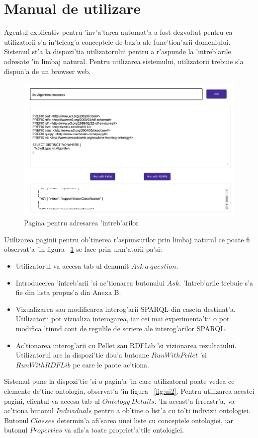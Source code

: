 \documentclass[12pt,a4paper,twoside]{report}
\begin{document}
\section{Manual de utilizare}

Agentul explicativ pentru 'inv'a'tarea automat'a a fost dezvoltat pentru ca utilizatorii s'a in'teleag'a conceptele de baz'a ale func'tion'arii domeniului. Sistemul st'a la dispozi'tia utilizatorului pentru a r'aspunde la 'intreb'arile adresate 'in limbaj natural. Pentru utilizarea sistemului, utilizatorii trebuie s'a dispun'a de un browser web. 

\begin{figure}
    \centering
    \includegraphics[width = 0.65 \linewidth]{img/pg1_cut.png}
        \caption{Pagina pentru adresarea 'intreb'arilor}
    \label{fig:ui1}
\end{figure}

Utilizarea paginii pentru ob'tinerea r'aspunsurilor prin limbaj natural ce poate fi observat'a 'in figura ~\ref{fig:ui1} se face prin urm'atorii pa'si:
\begin{itemize}
    \item Utilizatorul va accesa tab-ul denumit $Ask\ a\ question$.
    \item Introducerea 'intreb'arii 'si ac'tionarea butonului $Ask$. 'Intreb'arile trebuie s'a fie din lista propus'a din Anexa B. 
    \item Vizualizarea sau modificarea interog'arii SPARQL din caseta destinat'a. Utilizatorii pot vizualiza interogarea, iar cei mai experimenta'tii o pot modifica 'tin\ia nd cont de regulile de scriere ale interog'arilor SPARQL.
    \item Ac'tionarea interog'arii cu Pellet sau RDFLib 'si vizionarea rezultatului. Utilizatorul are la dispozi'tie dou'a butoane $RunWithPellet$ 'si $RunWithRDFLib$ pe care le paote ac'tiona.
\end{itemize}

Sistemul pune la dispozi'tie 'si o pagin'a 'in care utilizatorul poate vedea ce elemente de'tine ontologia, observat'a 'in figura ~\ref{fig:ui2}. Pentru utilizarea acestei pagini, clientul va accesa tab-ul $Ontology\ Details$. 'In aceast'a fereastr'a, va ac'tiona butonul $Individuals$ pentru a ob'tine o list'a cu to'ti indivizii ontologiei. Butonul $Classes$ determin'a afi'sarea unei liste cu conceptele ontologiei, iar butonul $Properties$ va afis'a toate propriet'a'tile ontologiei.
\end{document}
